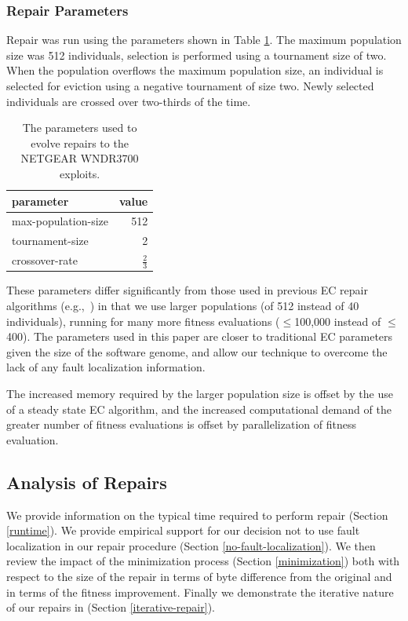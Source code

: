 \documentclass{sigcomm-alternate}
\begin{document}
\subsubsection{Repair Parameters}
\label{sec:parameters}
Repair was run using the parameters shown in Table \ref{parameters}.  The
maximum population size was 512 individuals, selection is performed
using a tournament size of two.  When the population overflows the
maximum population size, an individual is selected for eviction using
a negative tournament of size two.  Newly selected individuals are
crossed over two-thirds of the time.

\begin{table}[htb]
\centering
\begin{tabular}{lr}
parameter           & value         \\
\hline
max-population-size & 512           \\
tournament-size     & 2             \\
crossover-rate      & $\frac{2}{3}$ \\
\end{tabular}\caption{\label{parameters}The parameters used to evolve repairs to the NETGEAR WNDR3700 exploits.}

\end{table}

These parameters differ significantly from those used in previous EC
repair algorithms
(e.g.,~\cite{forrest2009genetic,legoues2011systematicstudy,le2012representations})
in that we
use larger populations (of 512 instead of 40 individuals), running for
many more fitness evaluations ($\leq$100,000 instead of $\leq$400).  The
parameters used in this paper are closer to traditional EC
parameters given the size of the software genome, and allow our
technique to overcome the lack of any fault localization information.

The increased memory required by the larger population size is offset
by the use of a steady state EC algorithm, and the increased
computational demand of the greater number of fitness evaluations is
offset by parallelization of fitness evaluation.

\subsection{Analysis of Repairs}
\label{analysis}

We provide information on the typical time required to perform repair
(Section \ref{runtime}).  We provide empirical support for our
decision not to use fault localization in our repair procedure
(Section \ref{no-fault-localization}).  We then review the impact of
the minimization process (Section \ref{minimization}) both with
respect to the size of the repair in terms of byte difference from the
original and in terms of the fitness improvement.  Finally we
demonstrate the iterative nature of our repairs in (Section
\ref{iterative-repair}).
\end{document}
